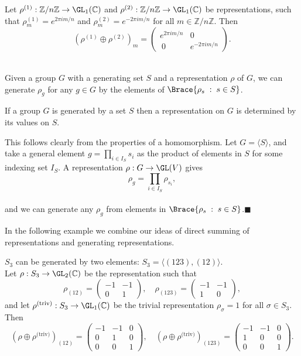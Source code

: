 \documentclass[../Project.tex]{subfiles}
\begin{document}
\begin{exam}[{\cite[Example 3.1.12]{1}}]
	Let $\rho^{(1)} : \mathbb{Z}/n\mathbb{Z} \to \GL_1(\mathbb{C})$ and $\rho^{(2)} : \mathbb{Z}/n\mathbb{Z} \to \GL_1(\mathbb{C})$ be representations, such that $\rho^{(1)}_{m} = e^{2\pi i m/n}$ and $\rho^{(2)}_{m} = e^{-2\pi i m/n}$ for all $m \in \mathbb{Z}/n\mathbb{Z}$. Then
	$$(\rho^{(1)} \oplus \rho^{(2)})_{m} = \begin{pmatrix}e^{2\pi i m/n} & 0 \\\ 0 & e^{-2 \pi i m/n}\end{pmatrix}.$$\\
\end{exam}

Given a group $G$ with a generating set $S$ and a representation $\rho$ of $G$, we can generate $\rho_g$ for any $g \in G$ by the elements of $\Brace{\rho_s\;:\;s \in S}$.

\begin{prop}[{\cite[page 16]{1}}]
	If a group $G$ is generated by a set $S$ then a representation on $G$ is determined by its values on $S$.
\end{prop}
\begin{proo*}
	This follows clearly from the properties of a homomorphism. Let $G = \langle S\rangle$, and take a general element $g = \prod\limits_{i \in I_S} s_i$  as the product of elements in $S$ for some indexing set $I_S$. A representation $\rho : G \to \GL(V)$ gives
	$$\rho_g = \prod\limits_{i \in I_S} \rho_{s_i},$$\\
	and we can generate any $\rho_g$ from elements in $\Brace{\rho_s\;:\;s \in S}$.\hfill $\blacksquare$
\end{proo*}

In the following example we combine our ideas of direct summing of representations and generating representations.

\begin{exam}[{\cite[Example 3.1.14]{1}}]
	\label{1}
	$S_3$ can be generated by two elements: $S_3 = \langle (123),(12)\rangle.$\\

	Let $\rho : S_3 \to \GL_2(\mathbb{C})$ be the representation such that 
	$$\rho_{(12)} = \begin{pmatrix}-1 & -1\\0 & 1\end{pmatrix},\quad \rho_{(123)} = \begin{pmatrix}-1 & -1\\ 1 & 0\end{pmatrix},$$
	and let $\rho^\text{(triv)} : S_3 \to \GL_1(\mathbb{C})$ be the trivial representation $\rho_\sigma = 1$ for all $\sigma \in S_3$. Then
	$$(\rho \oplus \rho^\text{(triv)})_{(12)} = \begin{pmatrix}-1 & -1 & 0\\ 0 & 1 & 0\\0 & 0 & 1\end{pmatrix},\quad (\rho \oplus \rho^\text{(triv)})_{(123)} = \begin{pmatrix}-1 & -1 & 0\\1 & 0 & 0\\0 & 0 & 1\end{pmatrix}.$$
\end{exam}
\end{document}
